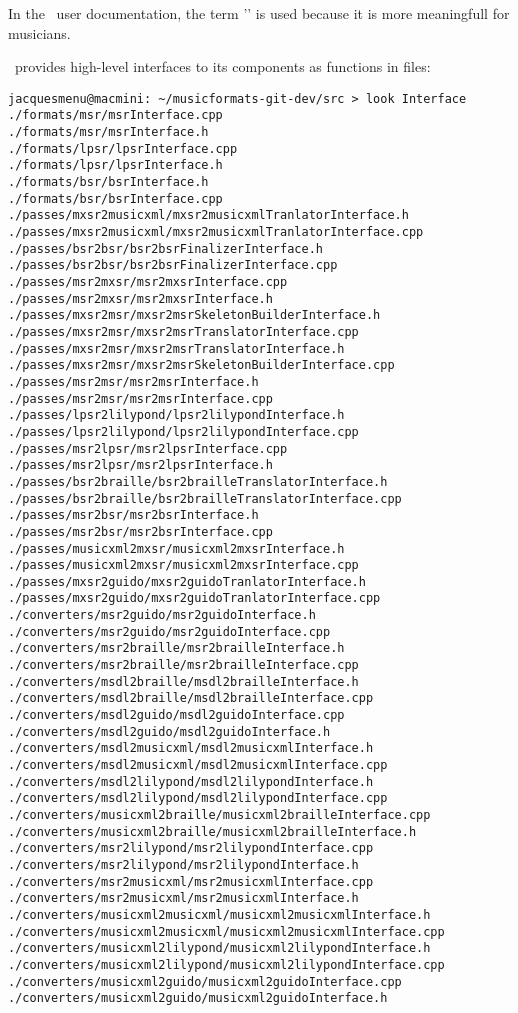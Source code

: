 In the \mf\ user documentation, the term '\converter' is used because it is more meaningfull for musicians.

\mf\ provides high-level interfaces to its components as functions in  files:
\begin{lstlisting}[language=Terminal]
jacquesmenu@macmini: ~/musicformats-git-dev/src > look Interface
./formats/msr/msrInterface.cpp
./formats/msr/msrInterface.h
./formats/lpsr/lpsrInterface.cpp
./formats/lpsr/lpsrInterface.h
./formats/bsr/bsrInterface.h
./formats/bsr/bsrInterface.cpp
./passes/mxsr2musicxml/mxsr2musicxmlTranlatorInterface.h
./passes/mxsr2musicxml/mxsr2musicxmlTranlatorInterface.cpp
./passes/bsr2bsr/bsr2bsrFinalizerInterface.h
./passes/bsr2bsr/bsr2bsrFinalizerInterface.cpp
./passes/msr2mxsr/msr2mxsrInterface.cpp
./passes/msr2mxsr/msr2mxsrInterface.h
./passes/mxsr2msr/mxsr2msrSkeletonBuilderInterface.h
./passes/mxsr2msr/mxsr2msrTranslatorInterface.cpp
./passes/mxsr2msr/mxsr2msrTranslatorInterface.h
./passes/mxsr2msr/mxsr2msrSkeletonBuilderInterface.cpp
./passes/msr2msr/msr2msrInterface.h
./passes/msr2msr/msr2msrInterface.cpp
./passes/lpsr2lilypond/lpsr2lilypondInterface.h
./passes/lpsr2lilypond/lpsr2lilypondInterface.cpp
./passes/msr2lpsr/msr2lpsrInterface.cpp
./passes/msr2lpsr/msr2lpsrInterface.h
./passes/bsr2braille/bsr2brailleTranslatorInterface.h
./passes/bsr2braille/bsr2brailleTranslatorInterface.cpp
./passes/msr2bsr/msr2bsrInterface.h
./passes/msr2bsr/msr2bsrInterface.cpp
./passes/musicxml2mxsr/musicxml2mxsrInterface.h
./passes/musicxml2mxsr/musicxml2mxsrInterface.cpp
./passes/mxsr2guido/mxsr2guidoTranlatorInterface.h
./passes/mxsr2guido/mxsr2guidoTranlatorInterface.cpp
./converters/msr2guido/msr2guidoInterface.h
./converters/msr2guido/msr2guidoInterface.cpp
./converters/msr2braille/msr2brailleInterface.h
./converters/msr2braille/msr2brailleInterface.cpp
./converters/msdl2braille/msdl2brailleInterface.h
./converters/msdl2braille/msdl2brailleInterface.cpp
./converters/msdl2guido/msdl2guidoInterface.cpp
./converters/msdl2guido/msdl2guidoInterface.h
./converters/msdl2musicxml/msdl2musicxmlInterface.h
./converters/msdl2musicxml/msdl2musicxmlInterface.cpp
./converters/msdl2lilypond/msdl2lilypondInterface.h
./converters/msdl2lilypond/msdl2lilypondInterface.cpp
./converters/musicxml2braille/musicxml2brailleInterface.cpp
./converters/musicxml2braille/musicxml2brailleInterface.h
./converters/msr2lilypond/msr2lilypondInterface.cpp
./converters/msr2lilypond/msr2lilypondInterface.h
./converters/msr2musicxml/msr2musicxmlInterface.cpp
./converters/msr2musicxml/msr2musicxmlInterface.h
./converters/musicxml2musicxml/musicxml2musicxmlInterface.h
./converters/musicxml2musicxml/musicxml2musicxmlInterface.cpp
./converters/musicxml2lilypond/musicxml2lilypondInterface.h
./converters/musicxml2lilypond/musicxml2lilypondInterface.cpp
./converters/musicxml2guido/musicxml2guidoInterface.cpp
./converters/musicxml2guido/musicxml2guidoInterface.h
\end{lstlisting}

